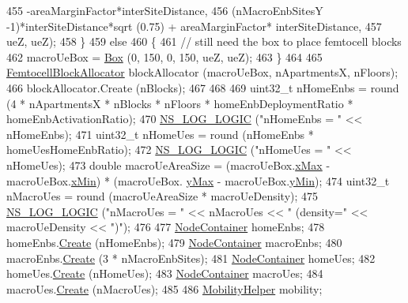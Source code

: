 \begin{DoxyCode}
455                         -areaMarginFactor*interSiteDistance, 
456                         (nMacroEnbSitesY -1)*interSiteDistance*sqrt (0.75) + areaMarginFactor*
      interSiteDistance,
457                         ueZ, ueZ);
458     \}
459   \textcolor{keywordflow}{else}
460     \{
461       \textcolor{comment}{// still need the box to place femtocell blocks}
462       macroUeBox = \hyperlink{classns3_1_1Box}{Box} (0, 150, 0, 150, ueZ, ueZ);
463     \}
464 
465   \hyperlink{classFemtocellBlockAllocator}{FemtocellBlockAllocator} blockAllocator (macroUeBox, nApartmentsX, nFloors);
466   blockAllocator.Create (nBlocks);
467 
468 
469   uint32\_t nHomeEnbs = round (4 * nApartmentsX * nBlocks * nFloors * homeEnbDeploymentRatio * 
      homeEnbActivationRatio);
470   \hyperlink{group__logging_ga88acd260151caf2db9c0fc84997f45ce}{NS\_LOG\_LOGIC} (\textcolor{stringliteral}{"nHomeEnbs = "} << nHomeEnbs);
471   uint32\_t nHomeUes = round (nHomeEnbs * homeUesHomeEnbRatio);
472   \hyperlink{group__logging_ga88acd260151caf2db9c0fc84997f45ce}{NS\_LOG\_LOGIC} (\textcolor{stringliteral}{"nHomeUes = "} << nHomeUes);
473   \textcolor{keywordtype}{double} macroUeAreaSize = (macroUeBox.\hyperlink{classns3_1_1Box_a50021049c756e770329145b25d9533a2}{xMax} - macroUeBox.\hyperlink{classns3_1_1Box_a1fd6a43d53258323331d34da600ff1c5}{xMin}) * (macroUeBox.
      \hyperlink{classns3_1_1Box_a001fd430a14b19efe925c818a332e392}{yMax} - macroUeBox.\hyperlink{classns3_1_1Box_a3865ed092f941186823539c9979002f8}{yMin});
474   uint32\_t nMacroUes = round (macroUeAreaSize * macroUeDensity);
475   \hyperlink{group__logging_ga88acd260151caf2db9c0fc84997f45ce}{NS\_LOG\_LOGIC} (\textcolor{stringliteral}{"nMacroUes = "} << nMacroUes << \textcolor{stringliteral}{" (density="} << macroUeDensity << \textcolor{stringliteral}{")"});
476 
477   \hyperlink{classns3_1_1NodeContainer}{NodeContainer} homeEnbs;
478   homeEnbs.\hyperlink{classns3_1_1NodeContainer_a787f059e2813e8b951cc6914d11dfe69}{Create} (nHomeEnbs);
479   \hyperlink{classns3_1_1NodeContainer}{NodeContainer} macroEnbs;
480   macroEnbs.\hyperlink{classns3_1_1NodeContainer_a787f059e2813e8b951cc6914d11dfe69}{Create} (3 * nMacroEnbSites);
481   \hyperlink{classns3_1_1NodeContainer}{NodeContainer} homeUes;
482   homeUes.\hyperlink{classns3_1_1NodeContainer_a787f059e2813e8b951cc6914d11dfe69}{Create} (nHomeUes);
483   \hyperlink{classns3_1_1NodeContainer}{NodeContainer} macroUes;
484   macroUes.\hyperlink{classns3_1_1NodeContainer_a787f059e2813e8b951cc6914d11dfe69}{Create} (nMacroUes);
485 
486   \hyperlink{classns3_1_1MobilityHelper}{MobilityHelper} mobility;

\end{DoxyCode}
